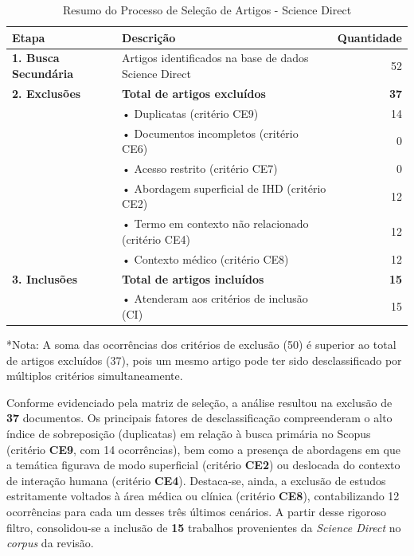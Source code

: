\documentclass[
	12pt,				%
	oneside,			%
	a4paper,			%
	english,			%
	brazil				%
	]{abntex2ppgsi}
\begin{document}
\begin{table}[h]
\centering
\caption{Resumo do Processo de Seleção de Artigos - Science Direct}
\label{tab:resumo_selecao_SD}
\begin{tabularx}{\textwidth}{lXr}
\toprule
\textbf{Etapa} & \textbf{Descrição} & \textbf{Quantidade} \\
\midrule
\textbf{1. Busca Secundária} & Artigos identificados na base de dados Science Direct & 52 \\
\midrule
\textbf{2. Exclusões} & \textbf{Total de artigos excluídos} & \textbf{37} \\
& \hspace{0.5cm}• Duplicatas (critério CE9) & 14 \\
& \hspace{0.5cm}• Documentos incompletos (critério CE6) & 0 \\
& \hspace{0.5cm}• Acesso restrito (critério CE7) & 0 \\
& \hspace{0.5cm}• Abordagem superficial de IHD (critério CE2) & 12 \\
& \hspace{0.5cm}• Termo em contexto não relacionado (critério CE4) & 12 \\
& \hspace{0.5cm}• Contexto médico (critério CE8) & 12 \\
\midrule
\textbf{3. Inclusões} & \textbf{Total de artigos incluídos} & \textbf{15} \\
& \hspace{0.5cm}• Atenderam aos critérios de inclusão (CI) & 15 \\
\bottomrule
\end{tabularx}
\vspace{0.2cm}
\footnotesize{*Nota: A soma das ocorrências dos critérios de exclusão (50) é superior ao total de artigos excluídos (37), pois um mesmo artigo pode ter sido desclassificado por múltiplos critérios simultaneamente.}
\end{table}

    Conforme evidenciado pela matriz de seleção, a análise resultou na exclusão de \textbf{37} documentos. Os principais fatores de desclassificação compreenderam o alto índice de sobreposição (duplicatas) em relação à busca primária no Scopus (critério \textbf{CE9}, com 14 ocorrências), bem como a presença de abordagens em que a temática figurava de modo superficial (critério \textbf{CE2}) ou deslocada do contexto de interação humana (critério \textbf{CE4}). Destaca-se, ainda, a exclusão de estudos estritamente voltados à área médica ou clínica (critério \textbf{CE8}), contabilizando 12 ocorrências para cada um desses três últimos cenários. A partir desse rigoroso filtro, consolidou-se a inclusão de \textbf{15} trabalhos provenientes da \textit{Science Direct} no \textit{corpus} da revisão.
\end{document}
